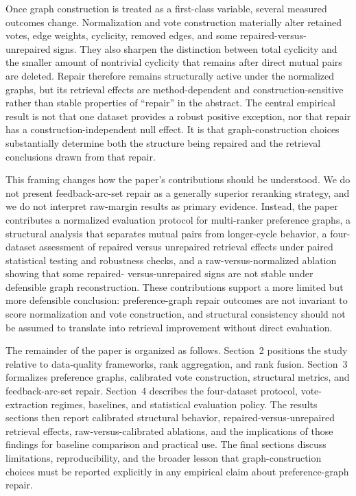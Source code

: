 \documentclass[manuscript,anonymous,review]{acmart}
\begin{document}
Once graph construction is treated as a first-class variable, several
measured outcomes change. Normalization and vote construction materially alter
retained votes, edge weights, cyclicity, removed edges, and some
repaired-versus-unrepaired signs. They also sharpen the distinction between
total cyclicity and the smaller amount of nontrivial cyclicity that remains
after direct mutual pairs are deleted. Repair therefore remains structurally
active under the normalized graphs, but its retrieval effects are
method-dependent and construction-sensitive rather than stable properties of
``repair'' in the abstract. The central empirical result is not that one
dataset provides a robust positive exception, nor that repair has a
construction-independent null effect. It is that graph-construction choices
substantially determine both the structure being repaired and the retrieval
conclusions drawn from that repair.

This framing changes how the paper's contributions should be understood. We
do not present feedback-arc-set repair as a generally superior reranking
strategy, and we do not interpret raw-margin results as primary evidence.
Instead, the paper contributes a normalized evaluation protocol for
multi-ranker preference graphs, a structural analysis that separates mutual
pairs from longer-cycle behavior, a four-dataset assessment of repaired versus
unrepaired retrieval effects under paired statistical testing and robustness
checks, and a raw-versus-normalized ablation showing that some repaired-
versus-unrepaired signs are not stable under defensible graph reconstruction.
These contributions support a more limited but more defensible conclusion:
preference-graph repair outcomes are not invariant to score normalization and
vote construction, and structural consistency should not be assumed to
translate into retrieval improvement without direct evaluation.

The remainder of the paper is organized as follows. Section~2 positions the
study relative to data-quality frameworks, rank aggregation, and rank fusion.
Section~3 formalizes preference graphs, calibrated vote construction,
structural metrics, and feedback-arc-set repair. Section~4 describes the
four-dataset protocol, vote-extraction regimes, baselines, and statistical
evaluation policy. The results sections then report calibrated structural
behavior, repaired-versus-unrepaired retrieval effects, raw-versus-calibrated
ablations, and the implications of those findings for baseline comparison and
practical use. The final sections discuss limitations, reproducibility, and
the broader lesson that graph-construction choices must be reported
explicitly in any empirical claim about preference-graph repair.
\end{document}
